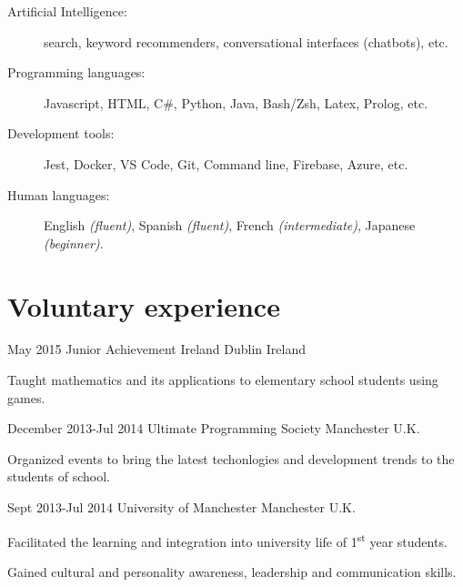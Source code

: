 \documentclass[10pt]{CurriculumVitae}
\begin{document}
    \begin{description}
      \item[Artificial Intelligence:] search, keyword recommenders, conversational interfaces (chatbots), etc.
      \item[Programming languages:] Javascript, HTML, C\#, Python, Java, Bash/Zsh, Latex, Prolog, etc.
      \item[Development tools:] Jest, Docker, VS Code, Git, Command line, Firebase, Azure, etc.
      \item[Human languages:] English \emph{(fluent)}, Spanish \emph{(fluent)}, French \emph{(intermediate)}, Japanese \emph{(beginner)}.
    \end{description}


  \section{Voluntary experience}
     
      {May 2015}
      {Junior Achievement Ireland}
      {Dublin}
      {Ireland}
      {
         \item Taught mathematics and its applications to elementary school students using games.
      }

      {December 2013-Jul 2014}
      {Ultimate Programming Society}
      {Manchester}
      {U.K.}
      {
         \item Organized events to bring the latest techonlogies and development trends to the students of school.
      }

      {Sept 2013-Jul 2014}
      {University of Manchester}
      {Manchester}
      {U.K.}
      {
         \item Facilitated the learning and integration into university life of 1\textsuperscript{st} year students.
         \item Gained cultural and personality awareness, leadership and communication skills.
      }
\end{document}
